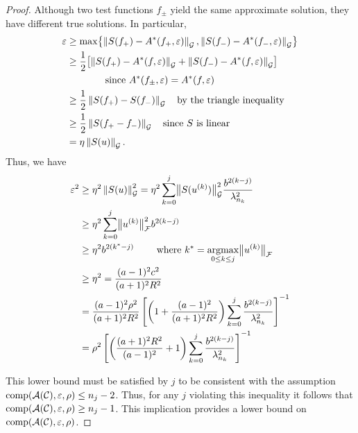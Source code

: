 \documentclass[graybox,footinfo]{svmult}
\newcommand{\DHJRnorm}[2][{}]{\ensuremath{\left \lVert #2 \right \rVert}_{#1}}
\newcommand{\DHJRbignorm}[2][{}]{\ensuremath{\bigl \lVert #2 \bigr \rVert}_{#1}}
\begin{document}
\begin{proof}
Although two test functions $f_\pm$ yield the same approximate solution, they have different true solutions.  In particular,
\begin{align*}
\varepsilon &\ge \max \bigl\{\DHJRnorm[\calG]{S(f_+) - A^*(f_+,\varepsilon)}, \DHJRnorm[\calG]{S(f_-) - A^*(f_-,\varepsilon)} \bigr\} \\
&\ge \frac 12 \bigl[\DHJRnorm[\calG]{S(f_+) - A^*(f,\varepsilon)} + \DHJRnorm[\calG]{S(f_-) - A^*(f,\varepsilon)}  \bigr] \\
&\qquad \qquad \text{since } A^*(f_\pm,\varepsilon) = A^*(f,\varepsilon) \\
&\ge \frac 12 \DHJRnorm[\calG]{S(f_+) - S(f_-)} \quad \text{by the triangle inequality}\\
&\ge \frac 12 \DHJRnorm[\calG]{S(f_+ - f_-)} \quad \text{since $S$ is linear}\\
&= \eta \DHJRnorm[\calG]{S(u)}.
\end{align*}
Thus, we have
\begin{align*}
\varepsilon^2  & \ge \eta^2 \DHJRnorm[\calG]{S(u)}^2= 
\eta^2 \sum_{k=0}^{j} \DHJRbignorm[\calG]{S(u^{(k)})}^2  \frac{b^{2(k-j)}}{\lambda_{n_k}^2}\\
& \ge \eta^2 
\sum_{k=0}^{j} \DHJRbignorm[\calF]{u^{(k)}}^2 
b^{2(k-j)}\\
& \ge  \eta^2 b^{2(k^{*}-j)} \qquad \text{ where } k^* = \argmax_{0 \le k \le j} \DHJRbignorm[\calF]{u^{(k)}} \\
& \ge \eta^2 = \frac{(a-1)^2c^2}{(a+1)^2R^2} \\
&
=\frac{(a-1)^2 \rho^2}{(a+1)^2R^2}\left[\left(1+\frac{(a-1)^2}{(a+1)^{2} R^2 }\right)\sum_{k=0}^j \frac{b^{2(k-j)}}{\lambda_{n_{k}}^2}\right]^{-1} \\
& =  \rho^2 \left[\left(\frac{(a+1)^{2} R^2 }{(a-1)^2} + 1\right)\sum_{k=0}^j \frac{b^{2(k-j)}}{\lambda_{n_{k}}^2}\right]^{-1} 
\end{align*}

This lower bound must be satisfied by $j$ to be consistent with the assumption $\textup{comp}({\mathcal{A}}({\mathcal{C}}),\varepsilon,\rho) \le n_j - 2$.  Thus, for any $j$ violating this inequality it follows that $\textup{comp}({\mathcal{A}}({\mathcal{C}}),\varepsilon,\rho) \ge n_j - 1$.  This implication provides a lower bound on $\textup{comp}({\mathcal{A}}({\mathcal{C}}),\varepsilon,\rho)$.
\end{proof}
\end{document}
